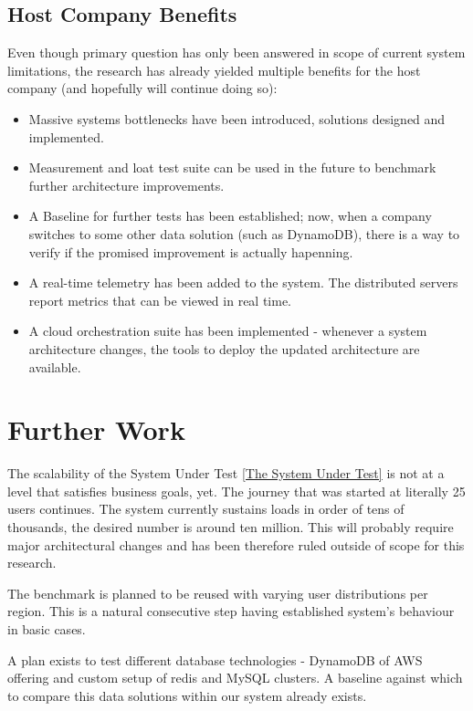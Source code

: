 \documentclass{uvamscse}
\begin{document}
\section{Host Company Benefits}
Even though primary question has only been answered in scope of current system limitations, the research has already yielded multiple benefits for the host company (and hopefully will continue doing so):
\begin{itemize}
  \item Massive systems bottlenecks have been introduced, solutions designed and implemented.
  \item Measurement and loat test suite can be used in the future to benchmark further architecture improvements.
  \item A Baseline for further tests has been established; now, when a company switches to some other data solution (such as DynamoDB), there is a way to verify if the promised improvement is actually hapenning.
  \item A real-time telemetry has been added to the system. The distributed servers report metrics that can be viewed in real time.
  \item A cloud orchestration suite has been implemented - whenever a system architecture changes, the tools to deploy the updated architecture are available.
\end{itemize}

\chapter{Further Work}\label{Further Work}

The scalability of the System Under Test \ref{The System Under Test} is not at a level that satisfies business goals, yet. The journey that was started at literally 25 users continues. The system currently sustains loads in order of tens of thousands, the desired number is around ten million. This will probably require major architectural changes and has been therefore ruled outside of scope for this research.

The benchmark is planned to be reused with varying user distributions per region. This is a natural consecutive step having established system's behaviour in basic cases.

A plan exists to test different database technologies - DynamoDB of AWS offering and custom setup of redis and MySQL clusters. A baseline against which to compare this data solutions within our system already exists.
\end{document}

